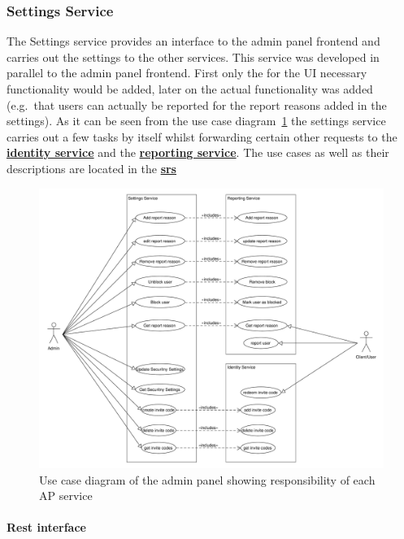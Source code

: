 \subsubsection{Settings Service}\label{subsubsec:settingsSer}

The Settings service provides an interface to the admin panel frontend and carries out the settings to the other
services.
This service was developed in parallel to the admin panel frontend. %
First only the for the UI necessary functionality would be added, later on the actual functionality was added
(e.g.\ that users can actually be reported for the report reasons added in the settings).
As it can be seen from the use case diagram~\ref{fig:ucd} the settings service carries out a few tasks by itself whilst
forwarding certain other requests to the \hyperref[subsubsec:identitySer]{\textbf{identity service}} and the
\hyperref[subsubsec:reportingSer]{\textbf{reporting service}}.
The use cases as well as their descriptions are located in the
\hyperref[ch:software-requirements-specification-(srs)]{\textbf{\ac{srs}}}

\begin{figure}[!ht]
    \centering
    \includegraphics[width=1.0\textwidth]{./images/UseCaseDiagramAdminPanel}
    \caption{Use case diagram of the admin panel showing responsibility of each AP service}
    \label{fig:ucd}
\end{figure}

\paragraph{Rest interface}

